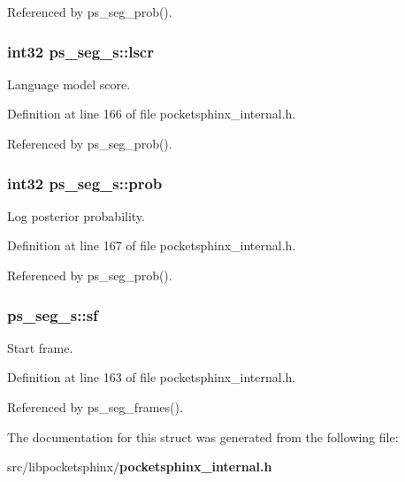 Referenced by ps\-\_\-seg\-\_\-prob().

\subsubsection[{lscr}]{\setlength{\rightskip}{0pt plus 5cm}int32 ps\-\_\-seg\-\_\-s\-::lscr}\label{structps__seg__s_a69e605f422eeed1a9c67437e8ddd8b08}


Language model score. 



Definition at line 166 of file pocketsphinx\-\_\-internal.\-h.



Referenced by ps\-\_\-seg\-\_\-prob().

\subsubsection[{prob}]{\setlength{\rightskip}{0pt plus 5cm}int32 ps\-\_\-seg\-\_\-s\-::prob}\label{structps__seg__s_ae683244d90d0a5339930b47757778432}


Log posterior probability. 



Definition at line 167 of file pocketsphinx\-\_\-internal.\-h.



Referenced by ps\-\_\-seg\-\_\-prob().

\subsubsection[{sf}]{ ps\-\_\-seg\-\_\-s\-::sf}\label{structps__seg__s_a885a599726cd0efba573d106d016e6e2}


Start frame. 



Definition at line 163 of file pocketsphinx\-\_\-internal.\-h.



Referenced by ps\-\_\-seg\-\_\-frames().



The documentation for this struct was generated from the following file\-:\begin{DoxyCompactItemize}
\item 
src/libpocketsphinx/{\bf pocketsphinx\-\_\-internal.\-h}\end{DoxyCompactItemize}
